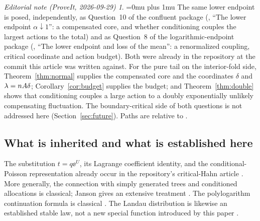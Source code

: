\documentclass[11pt,a4paper]{article}
\numberwithin{equation}{section}
\theoremstyle{definition}
\theoremstyle{remark}
\newtheorem*{ednoteinner}{Editorial note (ProveIt, 2026-09-29)}
\newenvironment{ednote}{\begin{ednoteinner}\sloppy\Urlmuskip=0mu plus 1mu\relax}{\end{ednoteinner}}
\begin{document}
\begin{ednote}
The same lower endpoint is posed, independently, as Question~10 of the
confluent package
(,
``The lower endpoint \(\alpha\downarrow1\)'': a compensated core, and
whether conditioning couples the largest actions to the total) and as
Question~8 of the logarithmic-endpoint package
(, ``The
lower endpoint and loss of the mean'': a renormalized coupling, critical
coordinate and action budget). Both were already in the repository at the
commit this article was written against. For the pure tail on the
interior-fold side, Theorem~\ref{thm:normal} supplies the compensated core
and the coordinates \(\delta\) and \(\lambda=nA\delta\);
Corollary~\ref{cor:budget} supplies the budget; and
Theorem~\ref{thm:double} shows that conditioning couples a large action to
a doubly exponentially unlikely compensating fluctuation. The
boundary-critical side of both questions is not addressed here
(Section~\ref{sec:future}). Paths are relative to
.
\end{ednote}

\subsection{What is inherited and what is established here}
The substitution \(t=q\ee^U\), its Lagrange coefficient identity, and the
conditional-Poisson representation already occur in the repository's
critical-Hahn article \cite{repo-critical}. More generally, the connection
with simply generated trees and conditioned allocations is classical;
Janson gives an extensive treatment \cite{janson}. The polylogarithm
continuation formula is classical \cite[Eq.~25.12.12]{dlmf-polylog}.
The Landau distribution is likewise an established stable law, not a new
special function introduced by this paper \cite{bulyak}.
\end{document}
